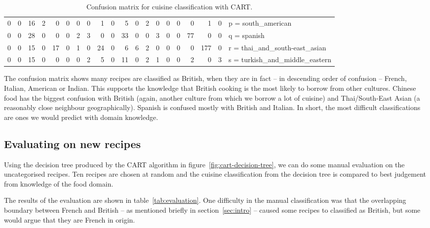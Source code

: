 \documentclass[11pt,a4paper]{article}
\begin{document}
\begin{sidewaystable}
\begin{tabular}{r r r r r r r r r r r r r r r r r r r | l}
    0&   0&  16&   2&   0&   0&   0&   0&   1&   0&   5&   0&   2&   0&   0&   0&   0&   1&   0& p = south\_american \\
    0&   0&  28&   0&   0&   0&   2&   3&   0&   0&  33&   0&   0&   3&   0&   0&  77&   0&   0& q = spanish \\
    0&   0&  15&   0&  17&   0&   1&   0&  24&   0&   6&   6&   2&   0&   0&   0&   0& 177&   0& r = thai\_and\_south-east\_asian \\
    0&   0&  15&   0&   0&   0&   0&   2&   5&   0&  11&   0&   2&   1&   0&   0&   2&   0&   3& s = turkish\_and\_middle\_eastern \\
  \end{tabular}
  \caption{Confusion matrix for cuisine classification with CART.}
  \label{tab:confusion}
\end{sidewaystable}

The confusion matrix shows many recipes are classified as British, when they are in
fact -- in descending order of confusion -- French, Italian, American or Indian. This
supports the knowledge that British cooking is the most likely to borrow
from other cultures. Chinese food has the biggest confusion with British (again,
another culture from which we borrow a lot of cuisine) and Thai/South-East Asian (a
reasonably close neighbour geographically). Spanish is confused mostly with British
and Italian. In short, the most difficult classifications are ones we would predict
with domain knowledge.

\subsection{Evaluating on new recipes}
\label{sec:evaluation}

Using the decision tree produced by the CART algorithm in figure~\ref{fig:cart-decision-tree},
we can do some manual evaluation on the uncategorised recipes. Ten recipes are chosen
at random and the cuisine classification from the decision tree is compared to best
judgement from knowledge of the food domain.

The results of the evaluation are shown in table~\ref{tab:evaluation}. One difficulty
in the manual classification was that the overlapping boundary between French and British -- as
mentioned briefly in section~\ref{sec:intro} -- caused some recipes to classified
as British, but some would argue that they are French in origin.
\end{document}
